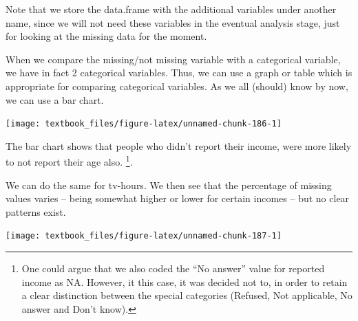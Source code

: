 \documentclass[]{tufte-book}
\newenvironment{Shaded}{}{}
\newcommand{\DataTypeTok}[1]{\textcolor[rgb]{0.56,0.13,0.00}{#1}}
\newcommand{\KeywordTok}[1]{\textcolor[rgb]{0.00,0.44,0.13}{\textbf{#1}}}
\newcommand{\NormalTok}[1]{#1}
\newcommand{\OperatorTok}[1]{\textcolor[rgb]{0.40,0.40,0.40}{#1}}
\newcommand{\StringTok}[1]{\textcolor[rgb]{0.25,0.44,0.63}{#1}}
\begin{document}
Note that we store the data.frame with the additional variables under another name, since we will not need these variables in the eventual analysis stage, just for looking at the missing data for the moment.

When we compare the missing/not missing variable with a categorical variable, we have in fact 2 categorical variables. Thus, we can use a graph or table which is appropriate for comparing categorical variables. As we all (should) know by now, we can use a bar chart.

\begin{Shaded}
\end{Shaded}

\texttt{[image: textbook\_files/figure-latex/unnamed-chunk-186-1]}

The bar chart shows that people who didn't report their income, were more likely to not report their age also. \footnote{One could argue that we also coded the ``No answer'' value for reported income as NA. However, it this case, it was decided not to, in order to retain a clear distinction between the special categories (Refused, Not applicable, No answer and Don't know).}.

We can do the same for tv-hours. We then see that the percentage of missing values varies -- being somewhat higher or lower for certain incomes -- but no clear patterns exist.

\begin{Shaded}
\end{Shaded}

\texttt{[image: textbook\_files/figure-latex/unnamed-chunk-187-1]}
\end{document}
